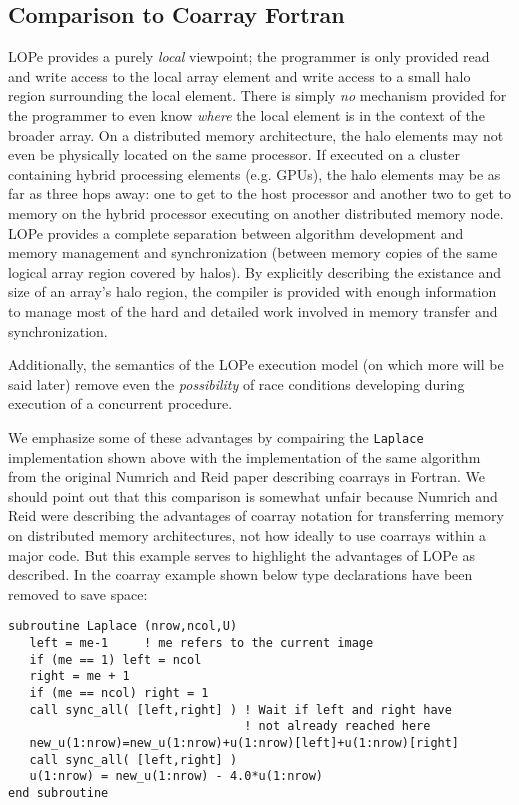 \subsection{Comparison to Coarray Fortran}

LOPe provides a purely \emph{local} viewpoint; the programmer is only provided read and write access
to the local array element and write access to a small halo region surrounding the local element.
There is simply \emph{no} mechanism provided for the programmer to even know \emph{where} the local
element is in the context of the broader array.  On a distributed memory architecture, the halo
elements may not even be physically located on the same processor.  If executed on a cluster
containing hybrid processing elements (e.g. GPUs), the halo elements may be as far as three hops
away: one to get to the host processor and another two to get to memory on the hybrid processor
executing on another distributed memory node.  LOPe provides a complete separation between algorithm
development and memory management and synchronization (between memory copies of the same logical
array region covered by halos).  By explicitly describing the existance and size of an array's halo
region, the compiler is provided with enough information to manage most of the hard and detailed work
involved in memory transfer and synchronization.

Additionally, the semantics of the LOPe execution model (on which more will be said later)
remove even the \emph{possibility} of race conditions developing during execution of a concurrent
procedure.

We emphasize some of these advantages by compairing the \texttt{Laplace} implementation shown above
with the implementation of the same algorithm from the original Numrich and Reid paper describing
coarrays in Fortran.  We should point out that this comparison is somewhat unfair because
Numrich and Reid were describing the advantages of coarray notation for transferring memory
on distributed memory architectures, not how ideally to use coarrays within a major code.  But
this example serves to highlight the advantages of LOPe as described.  In the coarray example
shown below type declarations have been removed to save space:
{\small \begin{verbatim}
subroutine Laplace (nrow,ncol,U)
   left = me-1     ! me refers to the current image
   if (me == 1) left = ncol
   right = me + 1
   if (me == ncol) right = 1
   call sync_all( [left,right] ) ! Wait if left and right have
                                 ! not already reached here
   new_u(1:nrow)=new_u(1:nrow)+u(1:nrow)[left]+u(1:nrow)[right]
   call sync_all( [left,right] )
   u(1:nrow) = new_u(1:nrow) - 4.0*u(1:nrow)
end subroutine
\end{verbatim}}

